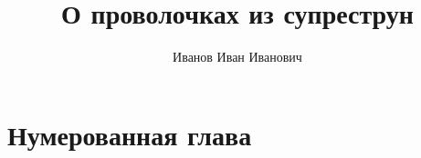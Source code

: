 \documentclass[a4paper,10pt]{report}
\title{О проволочках из супреструн}
\author{Иванов Иван Иванович}
\begin{document}
  \maketitle
  \chapter{Нумерованная глава}
  \label{c:num_chap}
\end{document}
